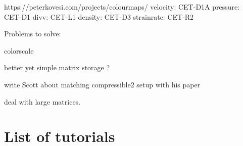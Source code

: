 \documentclass[a4paper]{article}
\begin{document}
https://peterkovesi.com/projects/colourmaps/
velocity: CET-D1A
pressure: CET-D1
divv: CET-L1
density: CET-D3
strainrate: CET-R2





\noindent Problems to solve:

colorscale 

better yet simple matrix storage ?

write Scott about matching compressible2 setup with his paper

deal with large matrices. 

\newpage
\section{List of tutorials}
\end{document}
